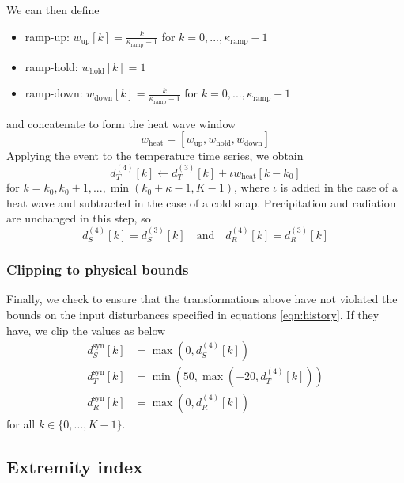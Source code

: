 \documentclass[preprint,12pt]{elsarticle}
\newcommand{\df}[2]{\displaystyle\frac{#1}{#2}}
\begin{document}
We can then define
\begin{itemize}
\item ramp-up:   $w_{\text{up}}[k]   = \df{k}{\kappa_{\text{ramp}} - 1}$ for $k=0,...,\kappa_{\text{ramp}} - 1$
\item ramp-hold: $w_{\text{hold}}[k] = 1$
\item ramp-down: $w_{\text{down}}[k] = \df{k}{\kappa_{\text{ramp}} - 1}$ for $k=0,...,\kappa_{\text{ramp}} - 1$
\end{itemize}
and concatenate to form the heat wave window
\begin{equation}
w_{\text{heat}} = [w_{\text{up}}, w_{\text{hold}}, w_{\text{down}}]
\label{eqn:w-heat}
\end{equation}
Applying the event to the temperature time series, we obtain
\begin{equation}
d_{T}^{(4)}[k] \leftarrow d_{T}^{(3)}[k] \pm \iota w_{\text{heat}}[k - k_{0}]
\label{eqn:T4a}
\end{equation}
for $k=k_{0}, k_{0}+1,...,\min(k_{0}+ \kappa - 1, K-1)$, where $\iota$ is added in the case of a heat wave and subtracted in the case of a cold snap. Precipitation and radiation are unchanged in this step, so
\begin{equation}
d_{S}^{(4)}[k] = d_{S}^{(3)}[k] \quad \text{and} \quad d_{R}^{(4)}[k] = d_{R}^{(3)}[k]
\label{eqn:P4P3-R4R3}
\end{equation}

\subsubsection{Clipping to physical bounds}\label{subsubsec:clipping}

Finally, we check to ensure that the transformations above have not violated the bounds on the input disturbances specified in equations \ref{eqn:history}. If they have, we clip the values as below
\begin{align}
d_{S}^{\text{syn}}[k] &= \max(0, d_{S}^{(4)}[k]) \\
d_{T}^{\text{syn}}[k] &= \min(50, \max(-20, d_{T}^{(4)}[k])) \\
d_{R}^{\text{syn}}[k] &= \max(0, d_{R}^{(4)}[k])
\label{eqn:PTR-syn}
\end{align}
for all $k\in\{ 0,...,K-1 \}$.

\subsection{Extremity index}\label{subsec:extremity}
\end{document}
